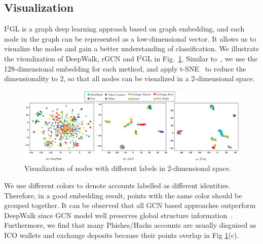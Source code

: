 \subsection{Visualization}
I$^2$GL is a graph deep learning approach based on graph embedding, and each node in the graph can be represented as a low-dimensional vector. It allows us to visualize the nodes and gain a better understanding of classification. We illustrate the visualization of DeepWalk, rGCN and I$^2$GL in Fig.~\ref{fig:visualization}. Similar to~\cite{wang2016structural}, we use the 128-dimensional embedding for each method, and apply t-SNE~\cite{maaten2008visualizing} to reduce the dimensionality to 2, so that all nodes can be visualized in a 2-dimensional space.
\begin{figure}
	\setlength{\tabcolsep}{-5pt}
  \centering
	\includegraphics[width=\textwidth]{fig/visualization}
	\caption{Visualization of nodes with different labels in 2-dimensional space.}
	\label{fig:visualization}
\end{figure}


We use different colors to denote accounts labelled as different identities. Therefore, in a good embedding result, points with the same color should be grouped together. It can be observed that all GCN based approaches outperform DeepWalk since GCN model well preserves global structure information~\cite{goyal2018graph}. Furthermore, we find that many Phishes/Hacks accounts are usually disguised as ICO wallets and exchange deposits because their points overlap in Fig \ref{fig:visualization}(c).

